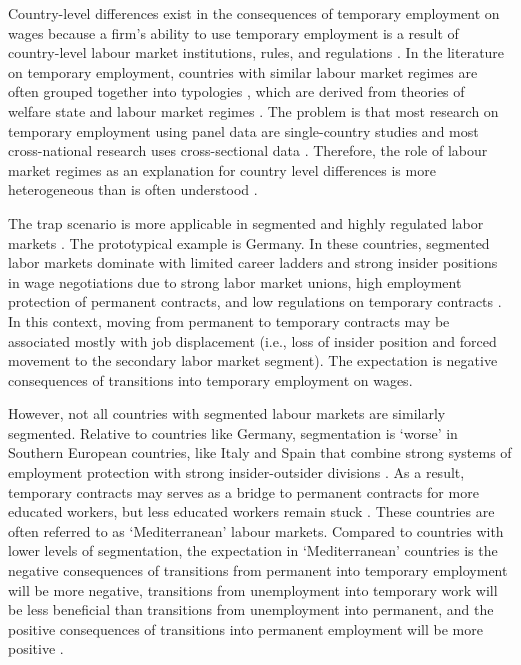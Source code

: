 \documentclass[12pt]{article}
\begin{document}
Country-level differences exist in the consequences of temporary employment on wages because a firm's ability to use temporary employment is a result of country-level labour market institutions, rules, and regulations \citep{giesecke_external_2004}.  In the literature on temporary employment, countries with similar labour market regimes are often grouped together into typologies \citep{barbieri_flexible_2009,muffels_labour_2008}, which are derived from theories of welfare state and labour market regimes \citep{esping-andersen_why_2000,korpi1985power}.  The problem is that most research on temporary employment using panel data are single-country studies and most cross-national research uses cross-sectional data \citep{latner_wage_2022}.  Therefore, the role of labour market regimes as an explanation for country level differences is more heterogeneous than is often understood \citep{fauser_gebel_2023}.  

The trap scenario is more applicable in segmented and highly regulated labor markets \citep{muffels_wilthagen_2013}.  The prototypical example is Germany.  In these countries, segmented labor markets dominate with limited career ladders and strong insider positions in wage negotiations due to strong labor market unions, high employment protection of permanent contracts, and low regulations on temporary contracts \citep{giesecke_temporary_2003}.  In this context, moving from permanent to temporary contracts may be associated mostly with job displacement (i.e., loss of insider position and forced movement to the secondary labor market segment).  The expectation is negative consequences of transitions into temporary employment on wages.

However, not all countries with segmented labour markets are similarly segmented.  Relative to countries like Germany, segmentation is `worse' in Southern European countries, like Italy and Spain that combine strong systems of employment protection with strong insider-outsider divisions \citep{barbieri_flexible_2009}.  As a result, temporary contracts may serves as a bridge to permanent contracts for more educated workers, but less educated workers remain stuck \citep{barbieri_labour_2009,casquel2004dynamics}.  These countries are often referred to as `Mediterranean' labour markets.  Compared to countries with lower levels of segmentation, the expectation in `Mediterranean' countries is the negative consequences of transitions from permanent into temporary employment will be more negative, transitions from unemployment into temporary work will be less beneficial than transitions from unemployment into permanent, and the positive consequences of transitions into permanent employment will be more positive \citep{barbieri_flexible_2009}.
\end{document}
